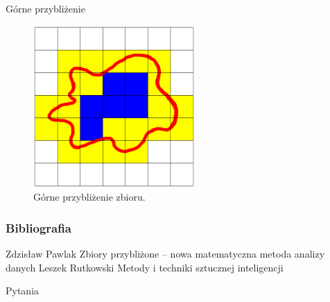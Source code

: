 \documentclass[10pt]{beamer}
\begin{document}
\begin{frame}{Górne przybliżenie}
\begin{center}
\begin{figure}
\includegraphics[width=0.55\textwidth]{Grafiki/gorne_przyblizenie.png}
\caption{Górne przybliżenie zbioru.}
\end{figure}
\end{center}
\end{frame}



\begin{frame}
\frametitle{Bibliografia}
\footnotesize
{
\begin{thebibliography}{99}
 Zdzisław Pawlak
\newblock Zbiory przybliżone -- nowa matematyczna metoda analizy danych 
 Leszek Rutkowski
\newblock Metody i techniki sztucznej inteligencji
\end{thebibliography}
}
\end{frame}




{\1
\begin{frame}
  \finalpage
  {
  \begin{huge}
  	Pytania
  \end{huge}
  
  }
\end{frame}
}
\end{document}

